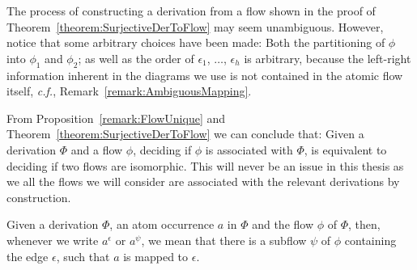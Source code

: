 
\begin{remark}
The process of constructing a derivation from a flow shown in the proof of Theorem~\vref{theorem:SurjectiveDerToFlow} may seem unambiguous. However, notice that some arbitrary choices have been made: Both the partitioning of $\phi$ into $\phi_1$ and $\phi_2$; as well as the order of $\epsilon_1$, $\dots$, $\epsilon_h$ is arbitrary, because the left-right information inherent in the diagrams we use is not contained in the atomic flow itself, \emph{c.f.}, Remark~\vref{remark:AmbiguousMapping}.
\end{remark}

\begin{remark}
From Proposition~\vref{remark:FlowUnique} and Theorem~\vref{theorem:SurjectiveDerToFlow} we can conclude that: Given a derivation $\Phi$ and a flow $\phi$, deciding if $\phi$ is associated with $\Phi$, is equivalent to deciding if two flows are isomorphic. This will never be an issue in this thesis as we all the flows we will consider are associated with the relevant derivations by construction.
\end{remark}

\begin{notation}
Given a derivation $\Phi$, an atom occurrence $a$ in $\Phi$ and the flow $\phi$ of $\Phi$, then, whenever we write $a^\epsilon$ or $a^\psi$, we mean that there is a subflow $\psi$ of $\phi$ containing the edge $\epsilon$, such that $a$ is mapped to $\epsilon$.
\end{notation}

